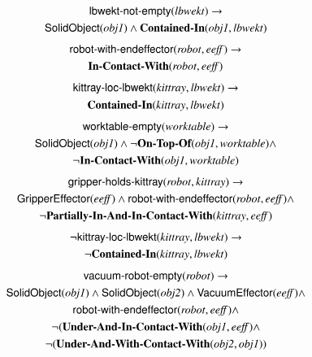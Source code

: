 \documentclass[preprint,12pt]{elsarticle}
\newcommand{\class}[1] {\textsf{#1}}
\newcommand{\stvar}[1] {\textsf{#1}}
\begin{document}
\begin{gather}
\label{eq:lbwekt-not-empty}
\stvar{lbwekt-not-empty}(\mathit{lbwekt}) \rightarrow \\
\class{SolidObject}(\textit{obj1}) \wedge \textbf{Contained-In}(\textit{obj1}, \mathit{lbwekt}) \notag
\end{gather}
\begin{gather}
\label{eq:robot-with-endeffector}
\stvar{robot-with-endeffector}(\mathit{robot},\mathit{eeff}) \rightarrow \\
\textbf{In-Contact-With}(\mathit{robot},\mathit{eeff}) \notag
\end{gather}
\begin{gather}
\label{eq:kittray-loc-lbwekt}
\stvar{kittray-loc-lbwekt}(\mathit{kittray},\mathit{lbwekt}) \rightarrow \\
\textbf{Contained-In}(\mathit{kittray},\mathit{lbwekt}) \notag
\end{gather}
\begin{gather}
\label{eq:worktable-empty}
\stvar{worktable-empty}(\mathit{worktable}) \rightarrow \\
\class{SolidObject}(\textit{obj1}) \wedge \neg\textbf{On-Top-Of}(\textit{obj1}, \mathit{worktable}) \wedge \notag\\
\neg \textbf{In-Contact-With}(\textit{obj1}, \mathit{worktable})\notag
\end{gather}
\begin{gather}
\label{eq:gripper-holds-kittray}
\stvar{gripper-holds-kittray}(\mathit{robot},\mathit{kittray}) \rightarrow \\
\class{GripperEffector}(\mathit{eeff}) \wedge \stvar{robot-with-endeffector}(\mathit{robot},\mathit{eeff}) \wedge \notag\\
\neg \textbf{Partially-In-And-In-Contact-With}(\mathit{kittray}, \mathit{eeff})\notag
\end{gather}
\begin{gather}
\label{eq:neg-kittray-loc-lbwekt}
\neg \stvar{kittray-loc-lbwekt}(\mathit{kittray},\mathit{lbwekt}) \rightarrow\\
\neg \textbf{Contained-In}(\mathit{kittray},\mathit{lbwekt}) \notag
\end{gather}
\begin{gather}
\label{eq:vacuum-robot-empty}
\stvar{vacuum-robot-empty}(\mathit{robot}) \rightarrow \\
\class{SolidObject}(\mathit{obj1}) \wedge \class{SolidObject}(\mathit{obj2}) \wedge \class{VacuumEffector}(\mathit{eeff}) \wedge\notag\\
\stvar{robot-with-endeffector}(\mathit{robot},\mathit{eeff}) \wedge \notag\\ \neg (\textbf{Under-And-In-Contact-With}(\mathit{obj1},\mathit{eeff}) \wedge \notag\\
\neg (\textbf{Under-And-With-Contact-With}(\mathit{obj2},\mathit{obj1}))\notag
\end{gather}
\end{document}
